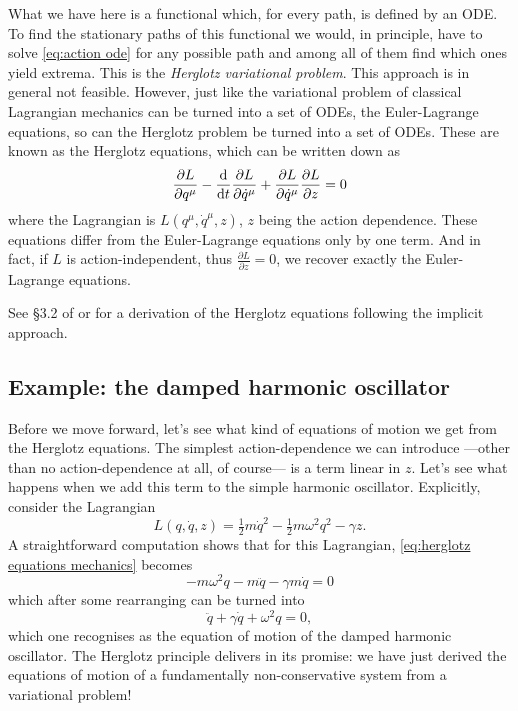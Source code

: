 \documentclass[../main.tex]{subfiles}
\begin{document}
What we have here is a functional which, for every path, is defined by an ODE. To find the
stationary paths of this functional we would, in principle, have to solve
\cref{eq:action ode} for any possible path and among all of them find which ones yield
extrema. This is the \emph{Herglotz variational problem}. This approach is in general not
feasible. However, just like the variational problem of classical Lagrangian mechanics can
be turned into a set of ODEs, the Euler-Lagrange equations, so can the Herglotz problem be
turned into a set of ODEs. These are known as the Herglotz equations, which can be written
down as
\begin{equation}\label{eq:herglotz equations mechanics}
	\frac{\partial L}{\partial q^\mu} - \frac{\mathrm{d}}{\mathrm{d} t}\frac{\partial L}{\partial \dot{q}^\mu}
	+\frac{\partial L}{\partial \dot{q}^\mu} \frac{\partial L}{\partial z} = 0
\end{equation}
where the Lagrangian is \( L(q^\mu, \dot{q}^\mu, z) \), \( z \) being the action
dependence. These equations differ from the Euler-Lagrange equations only by one term. And
in fact, if \( L \) is action-independent, thus \( \frac{\partial L}{\partial z} = 0 \),
we recover exactly the Euler-Lagrange equations. 

See \cite{Lazo2018} \S 3.2 of \cite{Leon2021} or for a derivation of the Herglotz
equations following the implicit approach. 

\subsection{Example: the damped harmonic oscillator}
Before we move forward, let's see what kind of equations of motion we get from the
Herglotz equations. The simplest action-dependence we can introduce ---other than no
action-dependence at all, of course--- is a term linear in \( z \). Let's see what happens
when we add this term to the simple harmonic oscillator. Explicitly, consider the
Lagrangian
\begin{equation*}
	L(q, \dot{q}, z) = \tfrac{1}{2}m\dot{q}^2 - \tfrac{1}{2} m\omega^2 q^2 - \gamma z. 
\end{equation*}
A straightforward computation shows that for this Lagrangian, \cref{eq:herglotz equations
mechanics} becomes
\begin{equation*}
	-m\omega^2 q - m\ddot{q} - \gamma m \dot{q} = 0
\end{equation*}
which after some rearranging can be turned into
\begin{equation*}
	\ddot{q} + \gamma\dot{q} + \omega^2 q = 0,
\end{equation*}
which one recognises as the equation of motion of the damped harmonic oscillator. The
Herglotz principle delivers in its promise: we have just derived the equations of motion
of a fundamentally non-conservative system from a variational problem!
\end{document}
